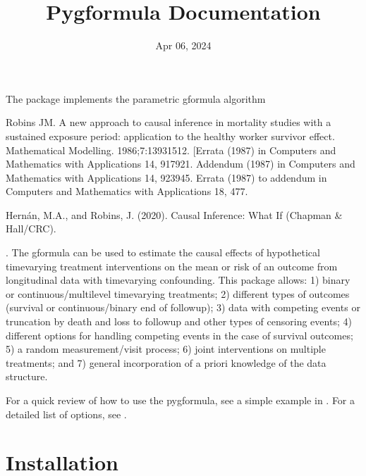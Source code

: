 \documentclass[letterpaper,10pt,english]{sphinxmanual}
\title{Pygformula Documentation}
\date{Apr 06, 2024}
\author{}
\begin{document}
\pagestyle{empty}
\sphinxmaketitle
\pagestyle{plain}
\sphinxtableofcontents
\pagestyle{normal}
\label{\detokenize{index::doc}}


\sphinxAtStartPar
The  package implements the parametric g\sphinxhyphen{}formula
algorithm \sphinxstepexplicit %
\begin{footnote}[1]\label{\thesphinxscope.1}%
\sphinxAtStartFootnote
Robins JM. A new approach to causal inference in mortality studies with a sustained exposure period:
application to the healthy worker survivor effect. Mathematical Modelling. 1986;7:1393\textendash{}1512. {[}Errata (1987)
in Computers and Mathematics with Applications 14, 917\sphinxhyphen{}921. Addendum (1987) in Computers and Mathematics
with Applications 14, 923\sphinxhyphen{}945. Errata (1987) to addendum in Computers and Mathematics with Applications
18, 477.
%
\end{footnote} \sphinxstepexplicit %
\begin{footnote}[2]\label{\thesphinxscope.2}%
\sphinxAtStartFootnote
Hernán, M.A., and Robins, J. (2020). Causal Inference: What If (Chapman \& Hall/CRC).
%
\end{footnote}. The g\sphinxhyphen{}formula can be used to estimate the causal effects of hypothetical time\sphinxhyphen{}varying
treatment interventions on the mean or risk of an outcome from longitudinal data with time\sphinxhyphen{}varying confounding.
This package allows: 1) binary or continuous/multi\sphinxhyphen{}level time\sphinxhyphen{}varying treatments; 2) different types of outcomes
(survival or continuous/binary end of follow\sphinxhyphen{}up); 3) data with competing events or truncation by death and loss
to follow\sphinxhyphen{}up and other types of censoring events; 4) different options for handling competing events in the case
of survival outcomes; 5) a random measurement/visit process; 6) joint interventions on multiple treatments; and
7) general incorporation of a priori knowledge of the data structure.

\sphinxAtStartPar
For a quick review of how to use the pygformula, see a simple example in {\hyperref[\detokenize{Get Started::doc}]{}}.
For a detailed list of options, see {\hyperref[\detokenize{Specifications/index::doc}]{}}.


\chapter{Installation}
\label{\detokenize{Installation:installation}}\label{\detokenize{Installation::doc}}
\end{document}
